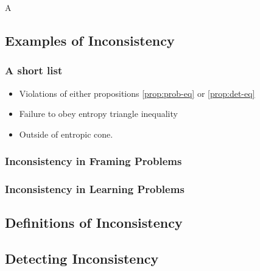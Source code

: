 \documentclass{article}
\begin{document}
	\begin{defn}
		A 
	\end{defn}
	
	\subsection{Examples of Inconsistency}\label{sec:inconsistency-ex}
	\subsubsection{A short list}
	\begin{itemize}[nosep]
		\item Violations of either propositions \ref{prop:prob-eq} or \ref{prop:det-eq}
		\item Failure to obey entropy triangle inequality
		\item Outside of entropic cone.
	\end{itemize}
	
	\subsubsection{Inconsistency in Framing Problems}
	\subsubsection{Inconsistency in Learning Problems}
	
	\subsection{Definitions of Inconsistency}
	\subsection{Detecting Inconsistency}
\end{document}
